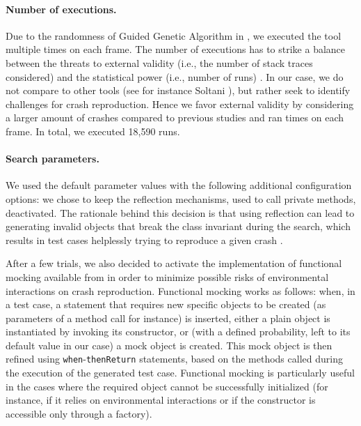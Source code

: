 \paragraph{Number of executions.}

Due to the randomness of Guided Genetic Algorithm in \evocrash, we executed the tool multiple times on each frame. 
The number of executions has to strike a balance between the threats to external validity (i.e., the number of stack traces considered) and the statistical power (i.e., number of runs) \cite{Fraser2014b, Arcuri2014}. 
In our case, we do not compare \evocrash to other tools (see for instance Soltani \etal \cite{soltani2017, Soltani2018a}), but rather seek to identify challenges for crash reproduction. 
Hence we favor external validity by considering a larger amount of crashes compared to previous studies \cite{Soltani2018a} and ran  times on each frame. In total, we executed 18,590 \evocrash runs.

\paragraph{Search parameters.}

We used the default parameter values \cite{Arcuri2011a, Fraser2014b} with the following additional configuration options: 
we chose to keep the reflection mechanisms, used to call private methods, deactivated.
The rationale behind this decision is that using reflection can lead to generating invalid objects that break the class invariant \cite{Liskov2000} during the search, which results in test cases helplessly trying to reproduce a given crash \cite{Chen2015}.

After a few trials, we also decided to activate the implementation of functional mocking available from \evosuite \cite{arcuri2017private} in order to minimize possible risks of environmental interactions on crash reproduction.
Functional mocking works as follows: when, in a test case, a statement that requires new specific objects to be created (as parameters of a method call for instance) is inserted, either a plain object is instantiated by invoking its constructor, or (with a defined probability, left to its default value in our case) a mock object is created. This mock object is then refined using \texttt{when}-\texttt{thenReturn} statements, based on the methods called during the execution of the generated test case. Functional mocking is particularly useful in the cases where the required object cannot be successfully initialized (for instance, if it relies on environmental interactions or if the constructor is accessible only through a factory). 

